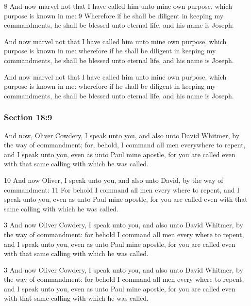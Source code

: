 		\begin{framed}
		\scriptsize
			\begin{compactdesc}
				\item[JSP] 8 And now marvel not that I have called him unto mine own purpose, which purpose is known in me: 9 Wherefore if he shall be diligent in keeping my commandments, he shall be blessed unto eternal life, and his name is Joseph.
				\item[DC 1835] And now marvel not that I have called him unto mine own purpose, which purpose is known in me: wherefore if he shall be diligent in keeping my commandments, he shall be blessed unto eternal life, and his name is Joseph.
				\item[DC 1844] And now marvel not that I have called him unto mine own purpose, which purpose is known in me: wherefore if he shall be diligent in keeping my commandments, he shall be blessed unto eternal life, and his name is Joseph.
			\end{compactdesc}
		\end{framed}

	\subsubsection{Section 18:9} %
		\label{DC18-9}

		And now, Oliver Cowdery, I speak unto you, and also unto David Whitmer, by the way of commandment; for, behold, I command all men everywhere to repent, and I speak unto you, even as unto Paul mine apostle, for you are called even with that same calling with which he was called.

		\begin{framed}
		\scriptsize
			\begin{compactdesc}
				\item[JSP] 10 And now Oliver, I speak unto you, and also unto David, by the way of commandment: 11 For behold I command all men every where to repent, and I speak unto you, even as unto Paul mine apostle, for you are called even with that same calling with which he was called.
				\item[DC 1835] 3 And now Oliver Cowdery, I speak unto you, and also unto David Whitmer, by the way of commandment: for behold I command all men every where to repent, and I speak unto you, even as unto Paul mine apostle, for you are called even with that same calling with which he was called. 
				\item[DC 1844] 3 And now Oliver Cowdery, I speak unto you, and also unto David Whitmer, by the way of commandment: for behold I command all men every where to repent, and I speak unto you, even as unto Paul mine apostle, for you are called even with that same calling with which he was called. 
			\end{compactdesc}
		\end{framed}

